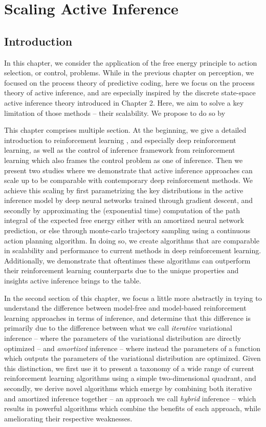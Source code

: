 \chapter{Scaling Active Inference}

\section{Introduction}

In this chapter, we consider the application of the free energy principle to action selection, or control, problems. While in the previous chapter on perception, we focused on the process theory of predictive coding, here we focus on the process theory of active inference, and are especially inspired by the discrete state-space active inference theory introduced in Chapter 2. Here, we aim to solve a key limitation of those methods -- their scalability. We propose to do so by 

This chapter comprises multiple section. At the beginning, we give a detailed introduction to reinforcement learning \citep{sutton2018reinforcement}, and especially deep reinforcement learning, as well as the control of inference framework \citep{rawlik2013probabilistic,levine2018reinforcement} from reinforcement learning which also frames the control problem as one of inference. Then we present two studies where we demonstrate that active inference approaches can scale up to be comparable with contemporary deep reinforcement methods. We achieve this scaling by first parametrizing the key distributions in the active inference model by deep neural networks trained through gradient descent, and secondly by approximating the (exponential time) computation of the path integral of the expected free energy either with an amortized neural network prediction, or else through monte-carlo trajectory sampling using a continuous action planning algorithm. In doing so, we create algorithms that are comparable in scalability and performance to current methods in deep reinforcement learning. Additionally, we demonstrate that oftentimes these algorithms can outperform their reinforcement learning counterparts due to the unique properties and insights active inference brings to the table.

In the second section of this chapter, we focus a little more abstractly in trying to understand the difference between model-free and model-based reinforcement learning approaches in terms of inference, and determine that this difference is primarily due to the difference between what we call \emph{iterative} variational inference -- where the parameters of the variational distribution are directly optimized -- and \emph{amortized} inference -- where instead the parameters of a function which outputs the parameters of the variational distribution are optimized. Given this distinction, we first use it to present a taxonomy of a wide range of current reinforcement learning algorithms using a simple two-dimensional quadrant, and secondly, we derive novel algorithms which emerge by combining both iterative and amortized inference together -- an approach we call \emph{hybrid} inference -- which results in powerful algorithms which combine the benefits of each approach, while ameliorating their respective weaknesses.

